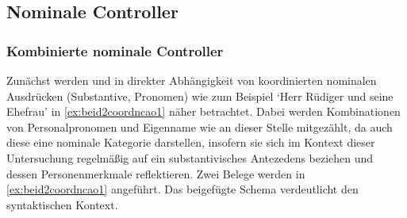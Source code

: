 \subsection{Nominale Controller}
\subsubsection{Kombinierte nominale Controller}
\label{subsubsec:perscombsgnp}

Zunächst werden  und  in direkter Abhängigkeit von
koordinierten nominalen Ausdrücken (Substantive, Pronomen) wie zum Beispiel
 `Herr Rüdiger und seine Ehefrau' in
\cref{ex:beid2coordncao1} näher betrachtet. Dabei werden Kombinationen von
Personalpronomen und Eigenname wie  an dieser Stelle
mitgezählt, da auch diese eine nominale Kategorie darstellen, insofern sie
sich im Kontext dieser Untersuchung regelmäßig auf ein substantivisches
Antezedens beziehen und dessen Personenmerkmale reflektieren.
Zwei Belege werden in \cref{ex:beid2coordncao1} angeführt. Das beigefügte
Schema verdeutlicht den syntaktischen Kontext.

